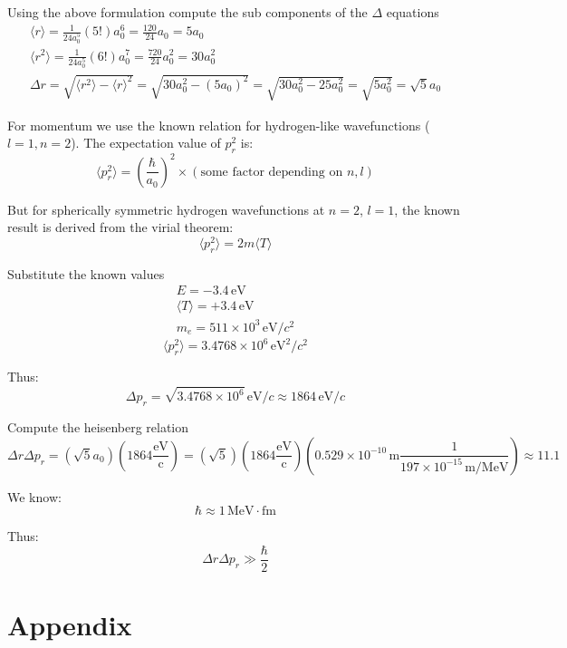 \documentclass[12pt]{article}
\begin{document}
        Using the above formulation compute the sub components of the $\Delta$ equations
        \begin{align*}
            \langle r \rangle = \frac{1}{24 a_0^5} (5!) a_0^6 = \frac{120}{24} a_0 = 5 a_0 \\
            \langle r^2 \rangle = \frac{1}{24 a_0^5} (6!) a_0^7 = \frac{720}{24} a_0^2 = 30 a_0^2 \\
            \Delta r = \sqrt{ \langle r^2 \rangle - \langle r \rangle^2 } = \sqrt{ 30a_0^2 - (5a_0)^2 } = \sqrt{ 30a_0^2 - 25a_0^2 } = \sqrt{5a_0^2} = \sqrt{5} a_0
        \end{align*}
        
        For momentum we use the known relation for hydrogen-like wavefunctions (\( l=1, n=2 \)). The expectation value of \( p_r^2 \) is:
        \[
            \langle p_r^2 \rangle = \left( \frac{\hbar}{a_0} \right)^2 \times \left( \text{some factor depending on } n, l \right)
        \]

        But for spherically symmetric hydrogen wavefunctions at \( n=2 \), \( l=1 \), the known result is derived from the virial theorem:
        \[
            \langle p_r^2 \rangle = 2m \langle T \rangle
        \]

        Substitute the known values
        \begin{align*}
            E = -3.4\, \text{eV} \\
            \langle T \rangle = +3.4\, \text{eV} \\
            m_e = 511 \times 10^3\, \text{eV}/c^2
        \end{align*}
        \[
        \langle p_r^2 \rangle = 3.4768 \times 10^6\, \text{eV}^2 / c^2
        \]

        Thus:
        \[
            \Delta p_r = \sqrt{3.4768 \times 10^6}\, \text{eV}/c \approx 1864\, \text{eV}/c
        \]

        Compute the heisenberg relation
        \[
            \Delta r \Delta p_r = (\sqrt{5} a_0)(1864 \frac{\text{eV}}{\text{c}}) = (\sqrt{5})(1864 \frac{\text{eV}}{\text{c}}) (0.529 \times 10^{-10}\, \text{m} \frac{1}{197 \times 10^{-15}\, \text{m/MeV}}) \approx 11.1
        \]

        We know:
        \[
            \hbar \approx 1\, \text{MeV} \cdot \text{fm}
        \]
        
        Thus:
        \[
            \Delta r \Delta p_r \gg \frac{\hbar}{2}
        \]

\section{Appendix}
\end{document}
